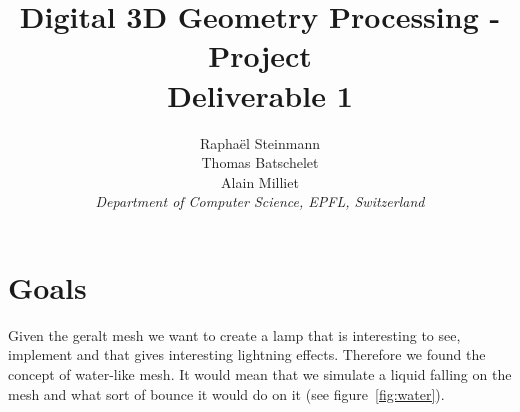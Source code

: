 \documentclass[10pt,conference,compsocconf]{IEEEtran}
\begin{document}
\title{Digital 3D Geometry Processing - Project\\
Deliverable 1}

\author{
  Rapha\"{e}l Steinmann\\
	Thomas Batschelet\\
	Alain Milliet\\
  \textit{Department of Computer Science, EPFL, Switzerland}
}

\maketitle


\section{Goals}
\label{sec:goals}
Given the geralt mesh we want to create a lamp that is interesting to see, implement and that gives interesting lightning effects. Therefore we found the concept of water-like mesh. It would mean that we simulate a liquid falling on the mesh and what sort of bounce it would do on it (see figure~\ref{fig:water}).
 
\end{document}
